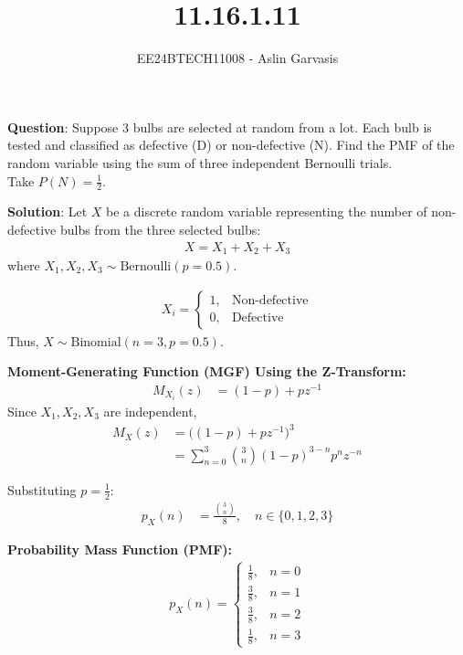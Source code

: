 \documentclass[journal]{IEEEtran}
\begin{document}

\vspace{3cm}

\title{11.16.1.11}
\author{EE24BTECH11008 - Aslin Garvasis}
\maketitle

\textbf{Question}:\newline
Suppose $3$ bulbs are selected at random from a lot. Each bulb is tested and classified as defective (D) or non-defective (N). Find the PMF of the random variable using the sum of three independent Bernoulli trials.\\ Take $P(N) = \frac{1}{2}.$

\textbf{Solution}:\newline
Let $X$ be a discrete random variable representing the number of non-defective bulbs from the three selected bulbs:
\begin{align}
    X = X_1+X_2+X_3
\end{align}
where $X_1, X_2, X_3 \sim \text{Bernoulli}(p=0.5)$. 

\begin{align}
    X_i = \begin{cases} 1, & \text{Non-defective} \\ 0, & \text{Defective} \end{cases}
\end{align}
Thus, $X \sim \text{Binomial}(n=3, p=0.5)$.

\textbf{Moment-Generating Function (MGF) Using the Z-Transform:}
\begin{align}
    M_{X_i}(z) &= (1-p) + p z^{-1}
\end{align}
Since $X_1, X_2, X_3$ are independent,
\begin{align}
    M_X(z) &= \big( (1-p) + p z^{-1} \big)^3 \\
           &= \sum_{n=0}^{3} \binom{3}{n} (1-p)^{3-n} p^n z^{-n}
\end{align}

Substituting $p=\frac{1}{2}$:
\begin{align}
    p_{X}(n) &= \frac{\binom{3}{n}}{8}, \quad n \in \{0,1,2,3\}
\end{align}

\textbf{Probability Mass Function (PMF):}
\begin{align}
    p_X(n) = \begin{cases} 
        \frac{1}{8}, & n = 0 \\
        \frac{3}{8}, & n = 1 \\
        \frac{3}{8}, & n = 2 \\
        \frac{1}{8}, & n = 3 
    \end{cases}
\end{align}
\end{document}
